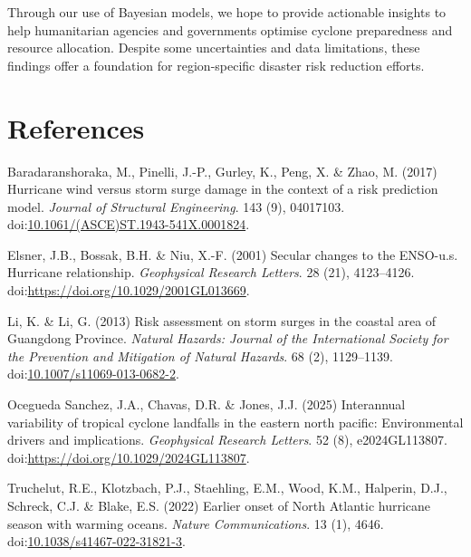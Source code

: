 \documentclass[
]{article}
\newlength{\cslhangindent}
\newenvironment{CSLReferences}[2] %
 {\begin{list}{}{%
  \setlength{\itemindent}{0pt}
  \setlength{\leftmargin}{0pt}
  \setlength{\parsep}{0pt}
  \ifodd #1
   \setlength{\leftmargin}{\cslhangindent}
   \setlength{\itemindent}{-1\cslhangindent}
  \fi
  \setlength{\itemsep}{#2\baselineskip}}}
 {\end{list}}
\begin{document}
Through our use of Bayesian models, we hope to provide actionable insights to help humanitarian agencies and governments optimise cyclone preparedness and resource allocation. Despite some uncertainties and data limitations, these findings offer a foundation for region-specific disaster risk reduction efforts.

\section{References}\label{references}

\label{refs}
\begin{CSLReferences}{0}{1}
Baradaranshoraka, M., Pinelli, J.-P., Gurley, K., Peng, X. \& Zhao, M. (2017) Hurricane wind versus storm surge damage in the context of a risk prediction model. \emph{Journal of Structural Engineering}. 143 (9), 04017103. doi:\href{https://doi.org/10.1061/(ASCE)ST.1943-541X.0001824}{10.1061/(ASCE)ST.1943-541X.0001824}.

Elsner, J.B., Bossak, B.H. \& Niu, X.-F. (2001) Secular changes to the ENSO-u.s. Hurricane relationship. \emph{Geophysical Research Letters}. 28 (21), 4123--4126. doi:\url{https://doi.org/10.1029/2001GL013669}.

Li, K. \& Li, G. (2013) {Risk assessment on storm surges in the coastal area of Guangdong Province}. \emph{Natural Hazards: Journal of the International Society for the Prevention and Mitigation of Natural Hazards}. 68 (2), 1129--1139. doi:\href{https://doi.org/10.1007/s11069-013-0682-2}{10.1007/s11069-013-0682-2}.

Ocegueda Sanchez, J.A., Chavas, D.R. \& Jones, J.J. (2025) Interannual variability of tropical cyclone landfalls in the eastern north pacific: Environmental drivers and implications. \emph{Geophysical Research Letters}. 52 (8), e2024GL113807. doi:\url{https://doi.org/10.1029/2024GL113807}.

Truchelut, R.E., Klotzbach, P.J., Staehling, E.M., Wood, K.M., Halperin, D.J., Schreck, C.J. \& Blake, E.S. (2022) Earlier onset of {North} {Atlantic} hurricane season with warming oceans. \emph{Nature Communications}. 13 (1), 4646. doi:\href{https://doi.org/10.1038/s41467-022-31821-3}{10.1038/s41467-022-31821-3}.

\end{CSLReferences}
\end{document}
